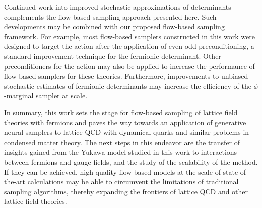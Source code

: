 \documentclass[aps,prd,twocolumn,nofootinbib,superscriptaddress,preprintnumbers]{revtex4-1}
\begin{document}
Continued work into improved stochastic approximations of determinants~\cite{Avron:2011,Finkenrath:2012az,han2015largescale,deForcrand:2018orx,sohldickstein2020equalities,meyer2020hutch,passenheim2021variational} complements the flow-based sampling approach presented here. Such developments may be combined with our proposed flow-based sampling framework. For example, most flow-based samplers constructed in this work were designed to target the action after the application of even-odd preconditioning, a standard improvement technique for the fermionic determinant. Other preconditioners for the action may also be applied to increase the performance of flow-based samplers for these theories. Furthermore, improvements to unbiased stochastic estimates of fermionic determinants may increase the efficiency of the $\phi$-marginal sampler at scale.

In summary, this work sets the stage for flow-based sampling of lattice field theories with fermions and paves the way towards an application of generative neural samplers to lattice QCD with dynamical quarks and similar problems in condensed matter theory. The next steps in this endeavor are the transfer of insights gained from the Yukawa model studied in this work to interactions between fermions and gauge fields, and the study of the scalability of the method. If they can be achieved, high quality flow-based models at the scale of state-of-the-art calculations may be able to circumvent the limitations of traditional sampling algorithms, thereby expanding the frontiers of lattice QCD and other lattice field theories.
\end{document}
